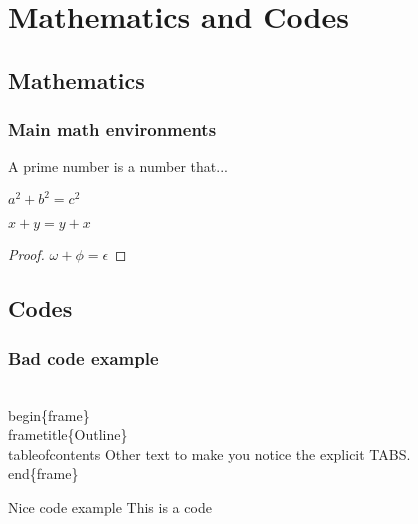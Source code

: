 \section{Mathematics and Codes}

\subsection{Mathematics}

\begin{frame}
    \frametitle{Main math environments}
    \begin{definition}
        A prime number is a number that...
    \end{definition}
    \begin{theorem}[Pythagoras] 
        $ a^2 + b^2 = c^2$
    \end{theorem}
    \begin{corollary}
        $ x + y = y + x  $
    \end{corollary}
    \begin{proof}
        $\omega +\phi = \epsilon $
    \end{proof}
\end{frame}

\subsection{Codes}

\begin{frame}[fragile]
    \frametitle{Bad code example}
    \begin{semiverbatim}
\\begin\{frame\}
    \\frametitle\{Outline\}
    \\tableofcontents
        Other text to make you notice the explicit TABS.
\\end\{frame\}
    \end{semiverbatim}
\end{frame}

\begin{frame}{Nice code example}
    This is a code
    \begin{mdframed}[backgroundcolor=yellow!10, rightline=false]
        
    \end{mdframed}
\end{frame}